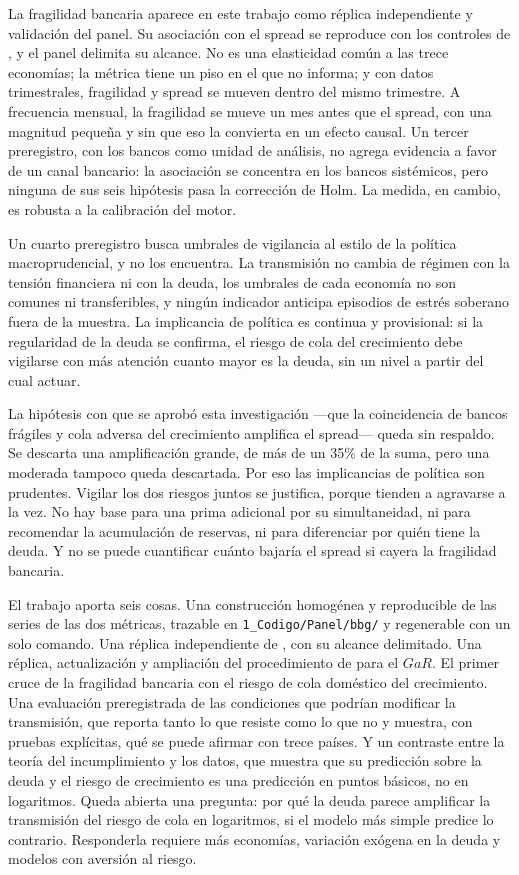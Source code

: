La fragilidad bancaria aparece en este trabajo como réplica independiente y validación del panel. Su asociación con el spread se reproduce con los controles de \citet{Chari2024b}, y el panel delimita su alcance. No es una elasticidad común a las trece economías; la métrica tiene un piso en el que no informa; y con datos trimestrales, fragilidad y spread se mueven dentro del mismo trimestre. A frecuencia mensual, la fragilidad se mueve un mes antes que el spread, con una magnitud pequeña y sin que eso la convierta en un efecto causal. Un tercer preregistro, con los bancos como unidad de análisis, no agrega evidencia a favor de un canal bancario: la asociación se concentra en los bancos sistémicos, pero ninguna de sus seis hipótesis pasa la corrección de Holm. La medida, en cambio, es robusta a la calibración del motor.

Un cuarto preregistro busca umbrales de vigilancia al estilo de la política macroprudencial, y no los encuentra. La transmisión no cambia de régimen con la tensión financiera ni con la deuda, los umbrales de cada economía no son comunes ni transferibles, y ningún indicador anticipa episodios de estrés soberano fuera de la muestra. La implicancia de política es continua y provisional: si la regularidad de la deuda se confirma, el riesgo de cola del crecimiento debe vigilarse con más atención cuanto mayor es la deuda, sin un nivel a partir del cual actuar.

La hipótesis con que se aprobó esta investigación ---que la coincidencia de bancos frágiles y cola adversa del crecimiento amplifica el spread--- queda sin respaldo. Se descarta una amplificación grande, de más de un 35\% de la suma, pero una moderada tampoco queda descartada. Por eso las implicancias de política son prudentes. Vigilar los dos riesgos juntos se justifica, porque tienden a agravarse a la vez. No hay base para una prima adicional por su simultaneidad, ni para recomendar la acumulación de reservas, ni para diferenciar por quién tiene la deuda. Y no se puede cuantificar cuánto bajaría el spread si cayera la fragilidad bancaria.

El trabajo aporta seis cosas. Una construcción homogénea y reproducible de las series de las dos métricas, trazable en \texttt{1\_Codigo/Panel/bbg/} y regenerable con un solo comando. Una réplica independiente de \citet{Chari2024b}, con su alcance delimitado. Una réplica, actualización y ampliación del procedimiento de \citet{OssandonBusch2022} para el $GaR$. El primer cruce de la fragilidad bancaria con el riesgo de cola doméstico del crecimiento. Una evaluación preregistrada de las condiciones que podrían modificar la transmisión, que reporta tanto lo que resiste como lo que no y muestra, con pruebas explícitas, qué se puede afirmar con trece países. Y un contraste entre la teoría del incumplimiento y los datos, que muestra que su predicción sobre la deuda y el riesgo de crecimiento es una predicción en puntos básicos, no en logaritmos. Queda abierta una pregunta: por qué la deuda parece amplificar la transmisión del riesgo de cola en logaritmos, si el modelo más simple predice lo contrario. Responderla requiere más economías, variación exógena en la deuda y modelos con aversión al riesgo.
